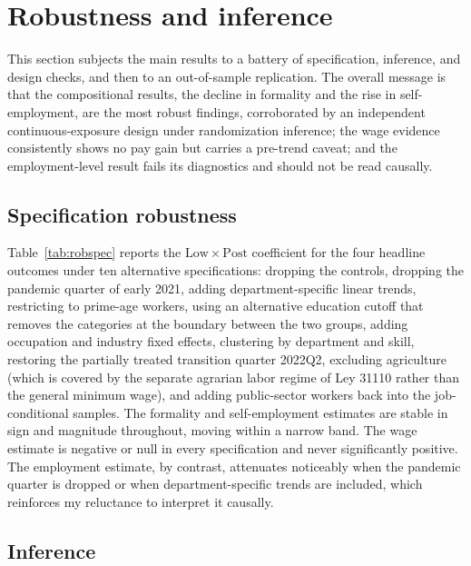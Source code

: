 \section{Robustness and inference}\label{sec:robustness}

This section subjects the main results to a battery of specification, inference, and
design checks, and then to an out-of-sample replication. The overall message is that the
compositional results, the decline in formality and the rise in
self-employment, are the most robust findings, corroborated by an independent
continuous-exposure design under randomization inference; the wage evidence consistently
shows no pay gain but carries a pre-trend caveat; and the employment-level result fails
its diagnostics and should not be read causally.

\subsection{Specification robustness}

Table~\ref{tab:robspec} reports the $\mathrm{Low}\times\mathrm{Post}$ coefficient for the
four headline outcomes under ten alternative specifications: dropping the controls,
dropping the pandemic quarter of early 2021, adding department-specific linear trends,
restricting to prime-age workers, using an alternative education cutoff that removes the
categories at the boundary between the two groups, adding occupation and industry fixed
effects, clustering by department and skill, restoring the partially treated transition
quarter 2022Q2, excluding agriculture (which is covered by the separate agrarian labor
regime of Ley 31110 rather than the general minimum wage), and adding public-sector
workers back into the job-conditional samples. The formality and self-employment
estimates are stable in sign and magnitude throughout, moving within a narrow band. The
wage estimate is negative or null in every specification and never significantly
positive. The employment estimate, by contrast, attenuates noticeably when the pandemic
quarter is dropped or when department-specific trends are included, which reinforces my
reluctance to interpret it causally.



\subsection{Inference}


